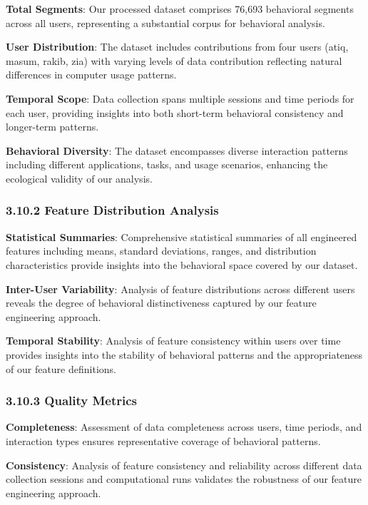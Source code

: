 \documentclass[
  11pt,
  a4paper,
]{article}
\begin{document}
\textbf{Total Segments}: Our processed dataset comprises 76,693
behavioral segments across all users, representing a substantial corpus
for behavioral analysis.

\textbf{User Distribution}: The dataset includes contributions from four
users (atiq, masum, rakib, zia) with varying levels of data contribution
reflecting natural differences in computer usage patterns.

\textbf{Temporal Scope}: Data collection spans multiple sessions and
time periods for each user, providing insights into both short-term
behavioral consistency and longer-term patterns.

\textbf{Behavioral Diversity}: The dataset encompasses diverse
interaction patterns including different applications, tasks, and usage
scenarios, enhancing the ecological validity of our analysis.

\subsubsection{3.10.2 Feature Distribution
Analysis}\label{feature-distribution-analysis-1}

\textbf{Statistical Summaries}: Comprehensive statistical summaries of
all engineered features including means, standard deviations, ranges,
and distribution characteristics provide insights into the behavioral
space covered by our dataset.

\textbf{Inter-User Variability}: Analysis of feature distributions
across different users reveals the degree of behavioral distinctiveness
captured by our feature engineering approach.

\textbf{Temporal Stability}: Analysis of feature consistency within
users over time provides insights into the stability of behavioral
patterns and the appropriateness of our feature definitions.

\subsubsection{3.10.3 Quality Metrics}\label{quality-metrics}

\textbf{Completeness}: Assessment of data completeness across users,
time periods, and interaction types ensures representative coverage of
behavioral patterns.

\textbf{Consistency}: Analysis of feature consistency and reliability
across different data collection sessions and computational runs
validates the robustness of our feature engineering approach.
\end{document}
